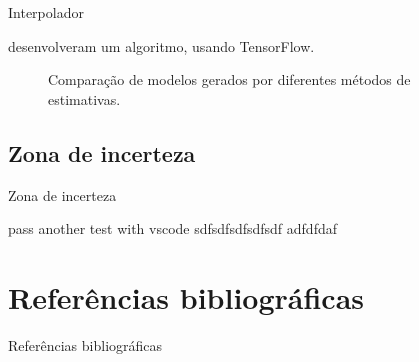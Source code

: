 \documentclass[aspectratio=169]{beamer}
\begin{document}
\begin{frame}{Interpolador}
	
	\cite{samson_estimation_ml} desenvolveram um algoritmo, usando TensorFlow.

	\begin{figure}[H] 
		\caption{Comparação de modelos gerados por diferentes métodos de estimativas.} \label{comparation}
		 \centering
	\end{figure}
	
\end{frame}

\subsection{Zona de incerteza}

\begin{frame}{Zona de incerteza}

	pass another test with vscode sdfsdfsdfsdfsdf adfdfdaf

\end{frame}



\section{Referências bibliográficas}

\begin{frame}{Referências bibliográficas}
	
	
\end{frame}
\end{document}
